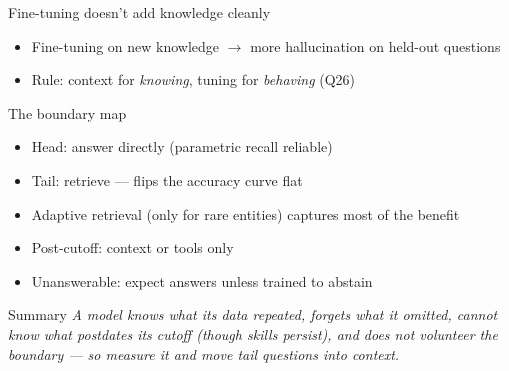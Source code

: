 \documentclass[aspectratio=169,11pt]{beamer}
\begin{document}
\begin{frame}{Fine-tuning doesn't add knowledge cleanly}
\begin{itemize}
\item Fine-tuning on new knowledge $\to$ more hallucination on held-out questions \cite{gekhman2024finetuning}
\item Rule: context for \emph{knowing}, tuning for \emph{behaving} (Q26)
\end{itemize}
\end{frame}
\begin{frame}{The boundary map}
\begin{itemize}
\item Head: answer directly (parametric recall reliable)
\item Tail: retrieve --- flips the accuracy curve flat \cite{mallen2023popqa}
\item Adaptive retrieval (only for rare entities) captures most of the benefit
\item Post-cutoff: context or tools only
\item Unanswerable: expect answers unless trained to abstain
\end{itemize}
\end{frame}
\begin{frame}{Summary}
\emph{A model knows what its data repeated, forgets what it omitted, cannot know what postdates its cutoff (though skills persist), and does not volunteer the boundary --- so measure it and move tail questions into context.}
\end{frame}
\end{document}
